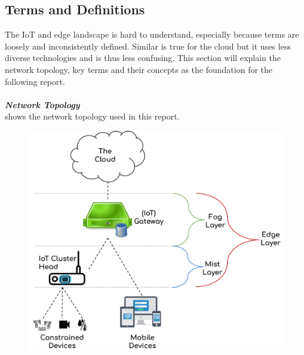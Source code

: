 
\subsection{Terms and Definitions} \label{sec:definitions}
The IoT and edge landscape is hard to understand, especially because terms are loosely and inconsistently defined. Similar is true for the cloud but it uses less diverse technologies and is thus less confusing. This section will explain the network topology, key terms and their concepts as the foundation for the following report.\\
\vspace{0.5mm} \ \\
\textbf{\textit{Network Topology}}\\
 shows the network topology used in this report. 
\begin{figure}[H]
    \centering
    \includegraphics[scale=0.18]{figures/network-topology-3-layer.png}
    \label{fig:networkTopology3Layer}
\end{figure}
